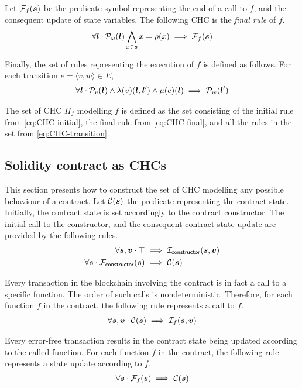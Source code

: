 Let $\mathcal{F}_f(\boldsymbol{s})$ be the predicate symbol
representing the end of a call to $f$, and the consequent
update of state variables. The following CHC is the 
{\em final rule} of $f$.
\begin{align}
\label{eq:CHC-final}
\forall\lvar\cdot\pred_\omega(\lvar)\bigwedge_{x\in\svar}x=\rho(x)\implies\finP_f(\svar)
\end{align}

Finally, the set of rules representing the execution of $f$ is defined as follows.
For each transition $e=\langle v,w\rangle\in E$,
\begin{align}
\label{eq:CHC-transition}
\forall\lvar\cdot\pred_v(\lvar)\wedge\lambda(v)(\lvar,\lvar')\wedge\mu(e)(\lvar)\implies\pred_w(\lvar')	
\end{align}

The set of CHC $\Pi_f$ modelling $f$ is defined as the set
consisting of the initial rule from \cref{eq:CHC-initial},
the final rule from \cref{eq:CHC-final}, and all the 
rules in the set from \cref{eq:CHC-transition}.

\subsection{Solidity contract as CHCs}
This section presents how to construct the set of CHC 
modelling any possible behaviour of a contract.
Let $\mathcal{C}(\boldsymbol{s})$ the predicate representing the contract state.
Initially, the contract state is set accordingly to the contract
constructor. 
The initial call to the constructor, and the consequent 
contract state update are provided by the following rules.
\begin{align}
\label{eq:CHC-constructor-initial}
\forall\svar,\farg\cdot\top&\implies\inP_\mathsf{constructor}(\svar,\farg)\\
\label{eq:CHC-constructor-final}
\forall\svar\cdot\finP_\mathsf{constructor}(\svar)&\implies\conP(\svar)
\end{align}

Every transaction in the blockchain
involving the contract is in fact a call
to a specific function. The order of such calls is
nondeterministic. Therefore, for each function $f$ in the contract, 
the following rule represents a call to $f$.
\begin{align}
\label{eq:CHC-call-initial}
\forall\svar,\farg\cdot\conP(\svar)\implies\inP_f(\svar,\farg)
\end{align}

Every error-free transaction results in the contract state being updated
according to the called function.
For each function $f$ in the contract, 
the following rule represents a state update
according to $f$.
\begin{align}
\label{eq:CHC-call-final}
\forall\svar\cdot\finP_f(\svar)\implies\conP(\svar)
\end{align}

